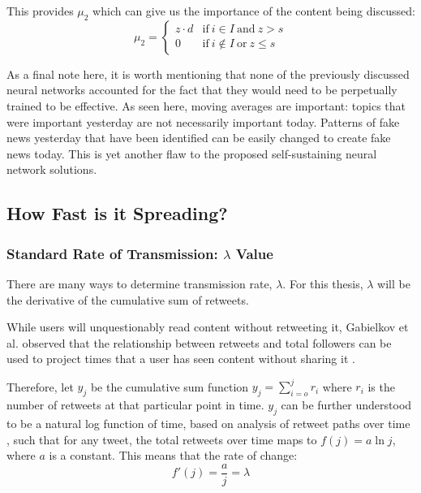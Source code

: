 \documentclass[preprint,review,12pt]{elsarticle}
\begin{document}
This provides $\mu_2$ which can give us the importance of the content being discussed:
\begin{equation}
\label{mu_2 equation}
    \mu_2 = \begin{cases}
    z\cdot d  & \text{if}\ i \in I\ \text{and}\  z > s \\
    0\  & \text{if}\ i \notin I \ \text{or} \ z \leq s
    \end{cases}
\end{equation}

As a final note here, it is worth mentioning that none of the previously discussed neural networks accounted for the fact that they would need to be perpetually trained to be effective. As seen here, moving averages are important: topics that were important yesterday are not necessarily important today. Patterns of fake news yesterday that have been identified can be easily changed to create fake news today. This is yet another flaw to the proposed self-sustaining neural network solutions.

\subsection{How Fast is it Spreading?}
\subsubsection{Standard Rate of Transmission: $\lambda$ Value}
There are many ways to determine transmission rate, $\lambda$. For this thesis, $\lambda$ will be the derivative of the cumulative sum of retweets. 

While users will unquestionably read content without retweeting it, Gabielkov et al. observed that the relationship between retweets and total followers can be used to project times that a user has seen content without sharing it \cite{gabielkov2016social}.

Therefore, let $y_j$ be the cumulative sum function $y_j = \sum_{i=o}^j r_i$ where $r_i$ is the number of retweets at that particular point in time. $y_j$ can be further understood to be a natural log function of time, based on analysis of retweet paths over time \cite{gabielkov2016social,starbird2014rumors,mention2018twitter}, such that for any tweet, the total retweets over time maps to $f(j) = a \ln j$, where $a$ is a constant. This means that the rate of change:
\begin{equation}
    \label{rate of transmission}
    f'(j) = \frac{a}{j} = \lambda
\end{equation}
\end{document}
